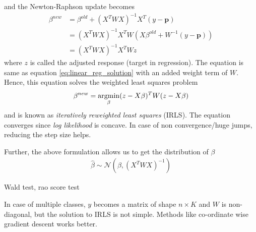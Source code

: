 \documentclass[../statistical_learning_notes.tex]{subfiles}
\begin{document}
    and the Newton-Raphson update becomes
    \begin{align*}
        \beta^{new} &= \beta^{old} + (X^{T}WX)^{-1} X^{T}(y - \mathbf{p})\\
        &= (X^{T}WX)^{-1} X^{T}W(X\beta^{old} + W^{-1}(y - \mathbf{p}))\\
        &= (X^{T}WX)^{-1} X^{T}Wz
    \end{align*}
    where $z$ is called the adjusted response (target in regression). The equation is same as equation \eqref{eq:linear_reg_solution} with an added weight term of $W$. Hence, this equation solves the weighted least squares problem
    \begin{align*}
        \beta^{new} = \operatorname*{argmin}_{\beta} (z - X\beta)^{T}W(z - X\beta)
    \end{align*}
    and is known as \emph{iteratively reweighted least squares} (IRLS). The equation converges since \emph{log likelihood} is concave. In case of non convergence/huge jumps, reducing the step size helps.\newline

    Further, the above formulation allows us to get the distribution of $\beta$
    \begin{align*}
        \hat{\beta} \sim \mathcal{N}(\beta, (X^{T}WX)^{-1})
    \end{align*}

    Wald test, rao score test\newline

    In case of multiple classes, $y$ becomes a matrix of shape $n \times K$ and $W$ is non-diagonal, but the solution to IRLS is not simple. Methods like co-ordinate wise gradient descent works better.\newline


\end{document}
